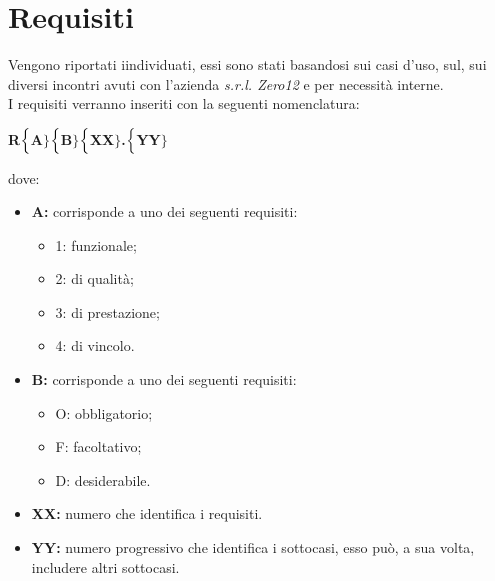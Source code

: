 \chapter{Requisiti}
Vengono riportati iindividuati, essi sono stati basandosi sui casi d'uso, sul, sui diversi incontri avuti con l'azienda \textit{s.r.l. Zero12} e per necessità interne. \\
I requisiti verranno inseriti con la seguenti nomenclatura:
\begin{center}
	\textbf{R$\Bigl\{$A$\Bigr\}$$\Bigl\{$B$\Bigr\}$$\Bigl\{$XX$\Bigr\}$.$\Bigl\{$YY$\Bigr\}$}
\end{center}
dove:
\begin{itemize}
	\item \textbf{A:} corrisponde a uno dei seguenti requisiti:
	\begin{itemize}
		\item 1: funzionale;
		\item 2: di qualità;
		\item 3: di prestazione;
		\item 4: di vincolo.
	\end{itemize}
	\item \textbf{B:} corrisponde a uno dei seguenti requisiti:
	\begin{itemize}
		\item O: obbligatorio;
		\item F: facoltativo;
		\item D: desiderabile.
	\end{itemize}
	\item \textbf{{XX}:} numero che identifica i requisiti.
	\item \textbf{{YY}:} numero progressivo che identifica i sottocasi, esso può, a sua volta, includere altri sottocasi.
\end{itemize}

\newpage
